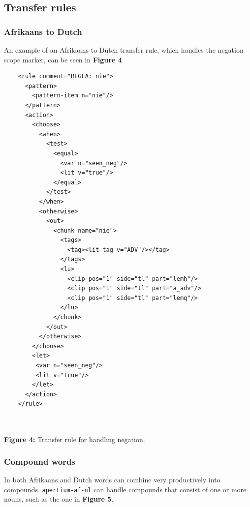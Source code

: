 \documentclass[a0,landscape]{a0poster}
\begin{document}
\begin{multicols}{4}
\subsection{Transfer rules}

\subsubsection{Afrikaans to Dutch}
An example of an Afrikaans to Dutch transfer rule, which handles the negation scope marker, can be seen in
{\bf Figure 4}

\begin{center}
\begin{minipage}[b]{25cm}
\begin{scriptsize}
\begin{verbatim}
    <rule comment="REGLA: nie">
      <pattern>
        <pattern-item n="nie"/>
      </pattern>
      <action>
        <choose>
          <when>
            <test>
              <equal>
                <var n="seen_neg"/>
                <lit v="true"/>
              </equal>
            </test>
          </when>
          <otherwise>
            <out>
              <chunk name="nie">
                <tags>
                  <tag><lit-tag v="ADV"/></tag>
                </tags>
                <lu>
                  <clip pos="1" side="tl" part="lemh"/>
                  <clip pos="1" side="tl" part="a_adv"/>
                  <clip pos="1" side="tl" part="lemq"/>
                </lu>
              </chunk>
            </out>
          </otherwise>
        </choose>
        <let>
         <var n="seen_neg"/>
         <lit v="true"/>
        </let>
      </action>
    </rule>
\end{verbatim}
\end{scriptsize}
\end{minipage}\\
~\\
\textbf{Figure 4:} Transfer rule for handling negation.
\vspace{0.5cm}
\end{center}

\subsubsection{Compound words}
In both Afrikaans and Dutch words can combine very productively into compounds.
{\small {\tt apertium-af-nl}} can handle compounds that consist of one or more nouns, 
such as the one in {\bf Figure 5}. \\


\end{multicols}
\end{document}
